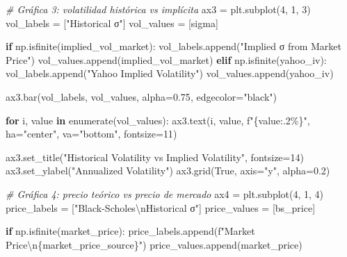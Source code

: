 \documentclass[
  11pt,
]{article}
\newenvironment{Shaded}{}{}
\newcommand{\BuiltInTok}[1]{\textcolor[rgb]{0.00,0.50,0.00}{#1}}
\newcommand{\CharTok}[1]{\textcolor[rgb]{0.25,0.44,0.63}{#1}}
\newcommand{\CommentTok}[1]{\textcolor[rgb]{0.38,0.63,0.69}{\textit{#1}}}
\newcommand{\ControlFlowTok}[1]{\textcolor[rgb]{0.00,0.44,0.13}{\textbf{#1}}}
\newcommand{\DecValTok}[1]{\textcolor[rgb]{0.25,0.63,0.44}{#1}}
\newcommand{\FloatTok}[1]{\textcolor[rgb]{0.25,0.63,0.44}{#1}}
\newcommand{\KeywordTok}[1]{\textcolor[rgb]{0.00,0.44,0.13}{\textbf{#1}}}
\newcommand{\NormalTok}[1]{#1}
\newcommand{\OperatorTok}[1]{\textcolor[rgb]{0.40,0.40,0.40}{#1}}
\newcommand{\SpecialCharTok}[1]{\textcolor[rgb]{0.25,0.44,0.63}{#1}}
\newcommand{\SpecialStringTok}[1]{\textcolor[rgb]{0.73,0.40,0.53}{#1}}
\newcommand{\StringTok}[1]{\textcolor[rgb]{0.25,0.44,0.63}{#1}}
\newcommand{\VariableTok}[1]{\textcolor[rgb]{0.10,0.09,0.49}{#1}}
\begin{document}
\begin{Shaded}
\begin{Highlighting}[]
\CommentTok{\# Gráfica 3: volatilidad histórica vs implícita}
\NormalTok{ax3 }\OperatorTok{=}\NormalTok{ plt.subplot(}\DecValTok{4}\NormalTok{, }\DecValTok{1}\NormalTok{, }\DecValTok{3}\NormalTok{)}
\NormalTok{vol\_labels }\OperatorTok{=}\NormalTok{ [}\StringTok{"Historical σ"}\NormalTok{]}
\NormalTok{vol\_values }\OperatorTok{=}\NormalTok{ [sigma]}

\ControlFlowTok{if}\NormalTok{ np.isfinite(implied\_vol\_market):}
\NormalTok{    vol\_labels.append(}\StringTok{"Implied σ from Market Price"}\NormalTok{)}
\NormalTok{    vol\_values.append(implied\_vol\_market)}
\ControlFlowTok{elif}\NormalTok{ np.isfinite(yahoo\_iv):}
\NormalTok{    vol\_labels.append(}\StringTok{"Yahoo Implied Volatility"}\NormalTok{)}
\NormalTok{    vol\_values.append(yahoo\_iv)}

\NormalTok{ax3.bar(vol\_labels, vol\_values, alpha}\OperatorTok{=}\FloatTok{0.75}\NormalTok{, edgecolor}\OperatorTok{=}\StringTok{"black"}\NormalTok{)}

\ControlFlowTok{for}\NormalTok{ i, value }\KeywordTok{in} \BuiltInTok{enumerate}\NormalTok{(vol\_values):}
\NormalTok{    ax3.text(i, value, }\SpecialStringTok{f"}\SpecialCharTok{\{}\NormalTok{value}\SpecialCharTok{:.2\%\}}\SpecialStringTok{"}\NormalTok{, ha}\OperatorTok{=}\StringTok{"center"}\NormalTok{, va}\OperatorTok{=}\StringTok{"bottom"}\NormalTok{, fontsize}\OperatorTok{=}\DecValTok{11}\NormalTok{)}

\NormalTok{ax3.set\_title(}\StringTok{"Historical Volatility vs Implied Volatility"}\NormalTok{, fontsize}\OperatorTok{=}\DecValTok{14}\NormalTok{)}
\NormalTok{ax3.set\_ylabel(}\StringTok{"Annualized Volatility"}\NormalTok{)}
\NormalTok{ax3.grid(}\VariableTok{True}\NormalTok{, axis}\OperatorTok{=}\StringTok{"y"}\NormalTok{, alpha}\OperatorTok{=}\FloatTok{0.2}\NormalTok{)}

\CommentTok{\# Gráfica 4: precio teórico vs precio de mercado}
\NormalTok{ax4 }\OperatorTok{=}\NormalTok{ plt.subplot(}\DecValTok{4}\NormalTok{, }\DecValTok{1}\NormalTok{, }\DecValTok{4}\NormalTok{)}
\NormalTok{price\_labels }\OperatorTok{=}\NormalTok{ [}\StringTok{"Black{-}Scholes}\CharTok{\textbackslash{}n}\StringTok{Historical σ"}\NormalTok{]}
\NormalTok{price\_values }\OperatorTok{=}\NormalTok{ [bs\_price]}

\ControlFlowTok{if}\NormalTok{ np.isfinite(market\_price):}
\NormalTok{    price\_labels.append(}\SpecialStringTok{f"Market Price}\CharTok{\textbackslash{}n}\SpecialCharTok{\{}\NormalTok{market\_price\_source}\SpecialCharTok{\}}\SpecialStringTok{"}\NormalTok{)}
\NormalTok{    price\_values.append(market\_price)}


\end{Highlighting}
\end{Shaded}
\end{document}
